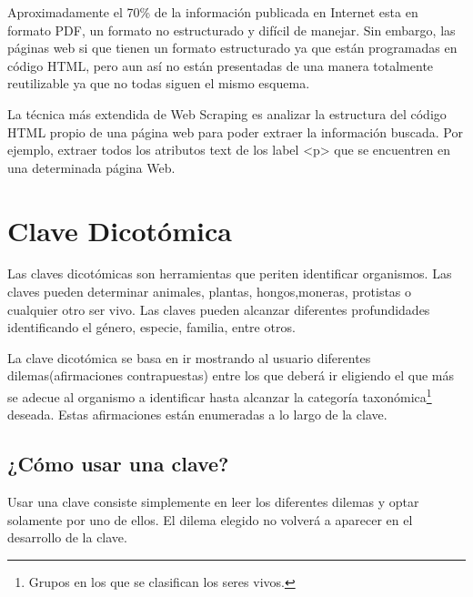 Aproximadamente el 70\% de la información publicada en Internet esta en formato PDF, un formato no estructurado y difícil de manejar. Sin embargo, las páginas web si que tienen un formato estructurado ya que están programadas en código HTML, pero aun así no están presentadas de una manera totalmente reutilizable ya que no todas siguen el mismo esquema.

La técnica más extendida de Web Scraping es analizar la estructura del código HTML propio de una página web para poder extraer la información buscada. Por ejemplo, extraer todos los atributos text de los label <p> que se encuentren en una determinada página Web.

\cite{webScraping}
\section{Clave Dicotómica}

Las claves dicotómicas son herramientas que periten identificar organismos. Las claves pueden determinar animales, plantas, hongos,moneras, protistas o cualquier otro ser vivo. Las claves pueden alcanzar diferentes profundidades identificando el género, especie, familia, entre otros.

La clave dicotómica se basa en ir mostrando al usuario diferentes dilemas(afirmaciones contrapuestas) entre los que deberá ir eligiendo el que más se adecue al organismo a identificar hasta alcanzar la categoría taxonómica\footnote{Grupos en los que se clasifican los seres vivos.} deseada. Estas afirmaciones están enumeradas a lo largo de la clave.

\subsection{¿Cómo usar una clave?}

Usar una clave consiste simplemente en leer los diferentes dilemas y optar solamente por uno de ellos. El dilema elegido no volverá a aparecer en el desarrollo de la clave.
\cite{claveDicotomica}


































































